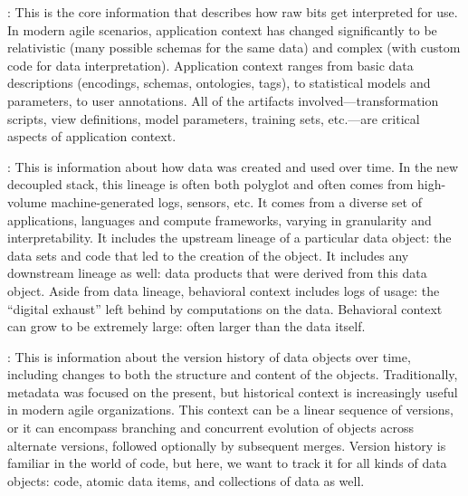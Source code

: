 \documentclass{sig-alternate}
\begin{document}
: This is the core information that describes how raw bits get interpreted for use. In modern agile scenarios, application context has changed significantly to be relativistic (many possible schemas for the same data) and complex (with custom code for data interpretation). Application context ranges from basic data descriptions (encodings, schemas, ontologies, tags), to statistical models and parameters, to user annotations.  
All of the artifacts involved---transformation scripts, view definitions, model parameters, training sets, etc.---are critical aspects of application context. 

: This is information about how data was created and used over time. 
In the new decoupled stack, this lineage is often both polyglot and often comes from high-volume machine-generated logs, sensors, etc. It comes from a diverse set of applications, languages and compute frameworks, varying in granularity and interpretability.
It includes the upstream lineage of a particular data object: the data sets and code that led to the creation of the object. It includes any downstream lineage as well: data products that were derived from this data object. 
Aside from data lineage, behavioral context includes logs of usage: the ``digital exhaust'' left behind by computations on the data. Behavioral context can grow to be extremely large: often larger than the data itself. 

: This is information about the version history of data objects over time, including changes to both the structure and content of the objects. Traditionally, metadata was focused on the present, but historical context is increasingly useful in modern agile organizations.
This context can be a linear sequence of versions, or it can encompass branching and concurrent evolution of objects across alternate versions, followed optionally by subsequent merges. Version history is familiar in the world of code, but here, we want to track it for all kinds of data objects: code, atomic data items, and collections of data as well. 
\end{document}
